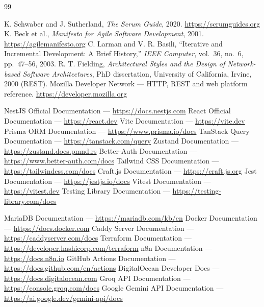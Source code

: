 \documentclass[12pt, a4paper, oneside]{report}
\begin{document}
\newpage
\renewcommand{\bibname}{Bibliography and Webography}
\begin{thebibliography}{99}

 K. Schwaber and J. Sutherland, \textit{The Scrum
  Guide}, 2020. \url{https://scrumguides.org}
 K. Beck et al., \textit{Manifesto for Agile
  Software Development}, 2001. \url{https://agilemanifesto.org}
 C. Larman and V. R. Basili, ``Iterative and Incremental
  Development: A Brief History,'' \textit{IEEE Computer}, vol.~36,
  no.~6, pp.~47--56, 2003.
 R. T. Fielding, \textit{Architectural Styles and the
  Design of Network-based Software Architectures}, PhD dissertation,
  University of California, Irvine, 2000 (REST).
 Mozilla Developer Network --- HTTP, REST and web platform
  reference. \url{https://developer.mozilla.org}

 NestJS Official Documentation --- \url{https://docs.nestjs.com}
 React Official Documentation --- \url{https://react.dev}
 Vite Documentation --- \url{https://vite.dev}
 Prisma ORM Documentation --- \url{https://www.prisma.io/docs}
 TanStack Query Documentation --- \url{https://tanstack.com/query}
 Zustand Documentation --- \url{https://zustand.docs.pmnd.rs}
 Better-Auth Documentation --- \url{https://www.better-auth.com/docs}
 Tailwind CSS Documentation --- \url{https://tailwindcss.com/docs}
 Craft.js Documentation --- \url{https://craft.js.org}
 Jest Documentation --- \url{https://jestjs.io/docs}
 Vitest Documentation --- \url{https://vitest.dev}
 Testing Library Documentation --- \url{https://testing-library.com/docs}

 MariaDB Documentation --- \url{https://mariadb.com/kb/en}
 Docker Documentation --- \url{https://docs.docker.com}
 Caddy Server Documentation --- \url{https://caddyserver.com/docs}
 Terraform Documentation --- \url{https://developer.hashicorp.com/terraform}
 n8n Documentation --- \url{https://docs.n8n.io}
 GitHub Actions Documentation --- \url{https://docs.github.com/en/actions}
 DigitalOcean Developer Docs --- \url{https://docs.digitalocean.com}
 Groq API Documentation --- \url{https://console.groq.com/docs}
 Google Gemini API Documentation --- \url{https://ai.google.dev/gemini-api/docs}
\end{thebibliography}
\end{document}
